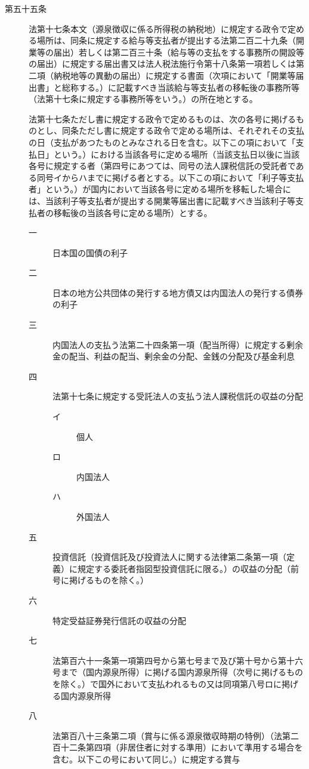 \documentclass[twocolumn,a4j,10pt]{ltjtarticle}
\begin{document}
\begin{description}
\item[第五十五条]法第十七条本文（源泉徴収に係る所得税の納税地）に規定する政令で定める場所は、同条に規定する給与等支払者が提出する法第二百二十九条（開業等の届出）若しくは第二百三十条（給与等の支払をする事務所の開設等の届出）に規定する届出書又は法人税法施行令第十八条第一項若しくは第二項（納税地等の異動の届出）に規定する書面（次項において「開業等届出書」と総称する。）に記載すべき当該給与等支払者の移転後の事務所等（法第十七条に規定する事務所等をいう。）の所在地とする。
\item[]法第十七条ただし書に規定する政令で定めるものは、次の各号に掲げるものとし、同条ただし書に規定する政令で定める場所は、それぞれその支払の日（支払があつたものとみなされる日を含む。以下この項において「支払日」という。）における当該各号に定める場所（当該支払日以後に当該各号に規定する者（第四号にあつては、同号の法人課税信託の受託者である同号イからハまでに掲げる者とする。以下この項において「利子等支払者」という。）が国内において当該各号に定める場所を移転した場合には、当該利子等支払者が提出する開業等届出書に記載すべき当該利子等支払者の移転後の当該各号に定める場所）とする。
\begin{description}
\item[一]日本国の国債の利子
\item[二]日本の地方公共団体の発行する地方債又は内国法人の発行する債券の利子
\item[三]内国法人の支払う法第二十四条第一項（配当所得）に規定する剰余金の配当、利益の配当、剰余金の分配、金銭の分配及び基金利息
\item[四]法第十七条に規定する受託法人の支払う法人課税信託の収益の分配
\begin{description}
\item[イ]個人
\item[ロ]内国法人
\item[ハ]外国法人
\end{description}
\item[五]投資信託（投資信託及び投資法人に関する法律第二条第一項（定義）に規定する委託者指図型投資信託に限る。）の収益の分配（前号に掲げるものを除く。）
\item[六]特定受益証券発行信託の収益の分配
\item[七]法第百六十一条第一項第四号から第七号まで及び第十号から第十六号まで（国内源泉所得）に掲げる国内源泉所得（次号に掲げるものを除く。）で国外において支払われるもの又は同項第八号ロに掲げる国内源泉所得
\item[八]法第百八十三条第二項（賞与に係る源泉徴収時期の特例）（法第二百十二条第四項（非居住者に対する準用）において準用する場合を含む。以下この号において同じ。）に規定する賞与
\end{description}
\end{description}
\end{document}

